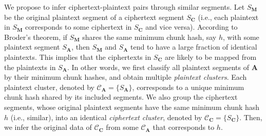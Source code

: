 \documentclass[bachelor]{thesis-uestc}
\begin{document}








 
We propose to infer ciphertext-plaintext pairs through similar segments. Let $S_\mathbf{M}$ be the original plaintext segment of a ciphertext segment $S_\mathbf{C}$ (i.e., each plaintext in $S_\mathbf{M}$ corresponds to some ciphertext in $S_\mathbf{C}$ and vice versa). According to Broder's theorem, if $S_\mathbf{M}$ shares the same minimum chunk hash, say $h$, with some plaintext segment $S_\mathbf{A}$, then $S_\mathbf{M}$  and $S_\mathbf{A}$ tend to have a large fraction of identical plaintexts. This implies that the ciphertexts in $S_\mathbf{C}$ are likely to be mapped from the plaintexts in  $S_\mathbf{A}$. In other words, we first classify all plaintext segments of $\mathbf{A}$ by their minimum chunk hashes, and obtain multiple {\em plaintext clusters}. Each plaintext cluster, denoted by $\mathcal{C}_\mathbf{A} = \{ S_\mathbf{A} \}$, corresponds to a unique minimum chunk hash shared by its included segments. We also 
group the ciphertext segments, whose original plaintext segments have the same minimum chunk hash $h$ (i.e., similar), into an identical {\em ciphertext cluster}, denoted by $\mathcal{C}_\mathbf{C} = \{ S_\mathbf{C} \}$. Then, we infer the original data of $\mathcal{C}_\mathbf{C}$ from some $\mathcal{C}_\mathbf{A}$ that corresponds to  $h$. 

   

\end{document}

